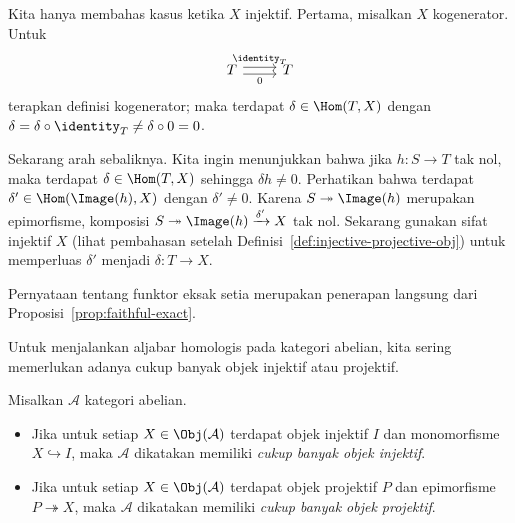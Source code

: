 \begin{bukti}
Kita hanya membahas kasus ketika $X$ injektif. Pertama, misalkan $X$ kogenerator.
Untuk
\[\begin{tikzcd}
	T \arrow[r, shift left, "{\identity_T}"] \arrow[r, shift right, "0"'] & T
\end{tikzcd}\]
terapkan definisi kogenerator; maka terdapat $\delta\in\Hom(T,X)$ dengan
$\delta=\delta\circ\identity_T\neq\delta\circ0=0$.

Sekarang arah sebaliknya. Kita ingin menunjukkan bahwa jika $h:S\to T$ tak nol,
maka terdapat $\delta\in\Hom(T,X)$ sehingga $\delta h\neq0$. Perhatikan bahwa
terdapat $\delta'\in\Hom(\Image(h),X)$ dengan $\delta'\neq0$. Karena
$S\twoheadrightarrow\Image(h)$ merupakan epimorfisme, komposisi
$S\twoheadrightarrow\Image(h)\xrightarrow{\delta'}X$
tak nol. Sekarang gunakan sifat injektif $X$ (lihat pembahasan setelah
Definisi~\ref{def:injective-projective-obj}) untuk memperluas $\delta'$ menjadi
$\delta:T\to X$.

Pernyataan tentang funktor eksak setia merupakan penerapan langsung dari
Proposisi~\ref{prop:faithful-exact}.
\end{bukti}

Untuk menjalankan aljabar homologis pada kategori abelian, kita sering memerlukan
adanya cukup banyak objek injektif atau projektif.

\begin{definisi}\label{def:enough-injectives}
Misalkan $\mathcal{A}$ kategori abelian.
\begin{itemize}
	\item Jika untuk setiap $X\in\Obj(\mathcal{A})$ terdapat objek injektif $I$ dan
	monomorfisme $X\hookrightarrow I$, maka $\mathcal{A}$ dikatakan memiliki
	\emph{cukup banyak objek injektif}.
	\item Jika untuk setiap $X\in\Obj(\mathcal{A})$ terdapat objek projektif $P$ dan
	epimorfisme $P\twoheadrightarrow X$, maka $\mathcal{A}$ dikatakan memiliki
	\emph{cukup banyak objek projektif}.
\end{itemize}
\end{definisi}


